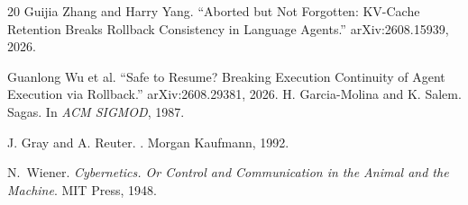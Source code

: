 \begin{thebibliography}{20}
Guijia Zhang and Harry Yang.
``Aborted but Not Forgotten: KV-Cache Retention Breaks Rollback Consistency in Language Agents.''
arXiv:2608.15939, 2026.

Guanlong Wu et al.
``Safe to Resume? Breaking Execution Continuity of Agent Execution via Rollback.''
arXiv:2608.29381, 2026.
H. Garcia-Molina and K. Salem.
\newblock Sagas.
\newblock In {\em ACM SIGMOD}, 1987.

J. Gray and A. Reuter.
.
\newblock Morgan Kaufmann, 1992.

N.~Wiener.
\newblock \emph{Cybernetics. Or Control and Communication in the Animal and the Machine}.
\newblock MIT Press, 1948.

\end{thebibliography}
